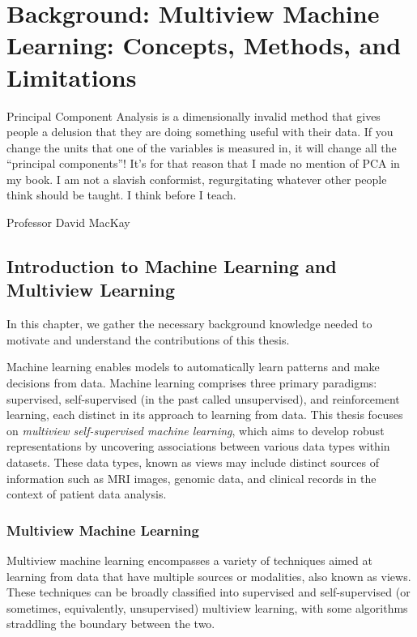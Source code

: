 \graphicspath{{chapters/background/}}


\chapter{Background: Multiview Machine Learning: Concepts, Methods, and Limitations}\label{chap:background}
\epigraph{Principal Component Analysis is a dimensionally invalid method that gives people a delusion that they are doing something useful with their data. If you change the units that one of the variables is measured in, it will change all the “principal components”! It’s for that reason that I made no mention of PCA in my book. I am not a slavish conformist, regurgitating whatever other people think should be taught. I think before I teach.}{Professor David MacKay}
\minitoc


\section{Introduction to Machine Learning and Multiview Learning}

In this chapter, we gather the necessary background knowledge needed to motivate and understand the contributions of this thesis.

Machine learning enables models to automatically learn patterns and make decisions from data.
Machine learning comprises three primary paradigms: supervised, self-supervised (in the past called unsupervised), and reinforcement learning, each distinct in its approach to learning from data.
This thesis focuses on \textit{multiview self-supervised machine learning}, which aims to develop robust representations by uncovering associations between various data types within datasets.
These data types, known as \gls{views} may include distinct sources of information such as MRI images, genomic data, and clinical records in the context of patient data analysis.

\subsection{Multiview Machine Learning}

Multiview machine learning encompasses a variety of techniques aimed at learning from data that have multiple sources or modalities, also known as \gls{views}.
These techniques can be broadly classified into supervised and self-supervised (or sometimes, equivalently, unsupervised) multiview learning, with some algorithms straddling the boundary between the two.


